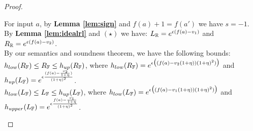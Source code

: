 \documentclass[a4paper,11pt]{article}
\begin{document}
\begin{proof}
\begin{itemize}
\begin{itemize}
	\end{itemize}
		For input $a$, by \textbf{Lemma \ref{lem:sign}} and $f(a) + 1 = f(a')$ we have $s = -1$.
		By \textbf{Lemma \ref{lem:idealrl}} and $(\star)$ we have:
		$L_{\mathbb{R}} = e^{\epsilon(f(a) - v_1)}$ 
		and $R_{\mathbb{R}} = e^{\epsilon(f(a) - v_2)}$.
		\\
		By our semantics and soundness theorem, we have the following bounds:
		\\
		$h_{low}(R_{\mathbb{F}}) \leq R_{\mathbb{F}} \leq h_{up}(R_{\mathbb{F}})$, where
%
		$h_{low}(R_{\mathbb{F}}) = e^{\epsilon 
		\big( (f(a) - v_2(1 + \eta)) (1 + \eta)^2) \big)}$
		and 
		$h_{up}(L_{\mathbb{F}})  = e^{\epsilon 
				\frac{(f(a) - \frac{v_2}{1 + \eta})}{(1 + \eta)^2}}$.  
		\\
		$h_{low}(L_{\mathbb{F}}) \leq L_{\mathbb{F}} \leq h_{up}(L_{\mathbb{F}})$, where
		$h_{low}(L_{\mathbb{F}}) = e^{\epsilon 
				\big( (f(a) - v_1(1 + \eta)) (1 + \eta)^2) \big)}$ 
		and 
		$h_{upper}(L_{\mathbb{F}}) = e^{\epsilon 
				\frac{f(a) - \frac{v_1}{1 + \eta}}{(1 + \eta)^2}}$.



\end{itemize}
\end{proof}
\end{document}
